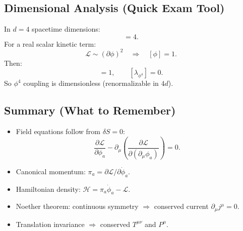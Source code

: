 \subsection{Dimensional Analysis (Quick Exam Tool)}
In $d=4$ spacetime dimensions:
\begin{equation}
[\mathcal{L}] = 4.
\end{equation}
For a real scalar kinetic term:
\begin{equation}
\mathcal{L}\sim (\partial\phi)^2
\quad\Rightarrow\quad
[\phi]=1.
\end{equation}
Then:
\begin{equation}
[m]=1,\qquad [\lambda_{\phi^4}]=0.
\end{equation}
So $\phi^4$ coupling is dimensionless (renormalizable in $4d$).

\subsection{Summary (What to Remember)}
\begin{itemize}
\item Field equations follow from $\delta S=0$:
\[
\frac{\partial\mathcal{L}}{\partial \phi_a}
-\partial_\mu\left(\frac{\partial\mathcal{L}}{\partial(\partial_\mu\phi_a)}\right)=0.
\]
\item Canonical momentum: $\pi_a=\partial\mathcal{L}/\partial\dot{\phi}_a$.
\item Hamiltonian density: $\mathcal{H}=\pi_a\dot{\phi}_a-\mathcal{L}$.
\item Noether theorem: continuous symmetry $\Rightarrow$ conserved current $\partial_\mu j^\mu=0$.
\item Translation invariance $\Rightarrow$ conserved $T^{\mu\nu}$ and $P^\mu$.
\end{itemize}
